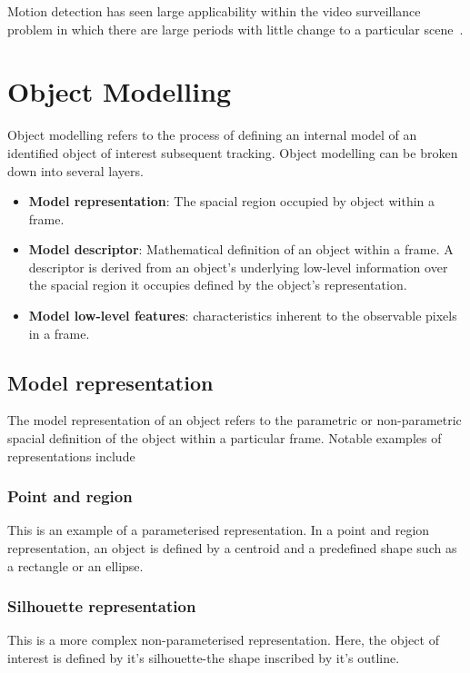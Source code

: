 Motion detection has seen large applicability within the video surveillance
problem in which there are large periods with little change to a particular
scene~\cite{Piccardi2004,Mashak2010}.

\section{Object Modelling}\label{literature_review_object_modelling}
Object modelling refers to the process of defining an internal model of
an identified object of interest subsequent tracking. Object modelling can be
broken down into several layers.
\begin{itemize}
    \item \textbf{Model representation}: The spacial region occupied by object within a
        frame.
    \item \textbf{Model descriptor}: Mathematical definition of an object within
        a frame. A descriptor is derived from an object's underlying low-level information over the spacial
        region it occupies defined by the object's representation.
    \item \textbf{Model low-level features}: characteristics inherent to the
        observable pixels in a frame.
\end{itemize}

\subsection{Model representation}
The model representation of an object refers to the parametric or non-parametric
spacial definition of the object within a particular frame. Notable examples of
representations include

\subsubsection{Point and region}
This is an example of a parameterised representation. In a point and region
representation, an object is defined by a centroid and a predefined shape such
as a rectangle or an ellipse.

\subsubsection{Silhouette representation}
This is a more complex non-parameterised representation. Here, the object of
interest is defined by it's silhouette-the shape inscribed by it's outline.

